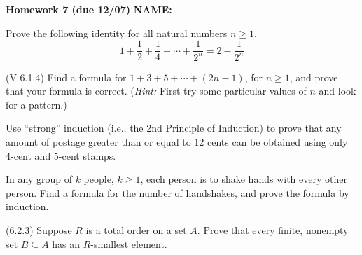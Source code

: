 \documentclass[addpoints,12pt]{exam}
\newif\ifanswers
\theoremstyle{remark}
\begin{document}
\hfill {\bf Homework 7 (due 12/07)} 
\hfill  \ifanswers {\bf ANSWERS} \else {\bf NAME:}\phantom{XXXXXXXXXXXXX} \fi 

  \renewcommand{\bigskip}{\vskip1cm}



\begin{questions} %

\pagestyle{foot}
  
\question[3] %
Prove the following identity for all natural numbers $n \geq 1$.
\begin{equation}
  \label{eq:3}
1 + \frac{1}{2} + \frac{1}{4} +\cdots + \frac{1}{2^n} = 2 - \frac{1}{2^n} %
\end{equation}


\newpage


\question[3] (V 6.1.4) Find a formula for $1+3+5 + \cdots + (2n - 1)$, for
$n \geq 1$, and prove that your formula is correct. ({\it Hint:} First try some particular values of $n$ and
look for a pattern.)

\newpage


\question[3] Use ``strong'' induction (i.e., the 2nd Principle of Induction)
to prove that any amount of postage greater than or equal to 12 cents can be
obtained using only 4-cent and 5-cent stamps.


\newpage
\question[3] In any group of $k$ people, $k\geq 1$, each person is to shake
hands with every other person.  Find a formula for the number of handshakes, and
prove the formula by induction. 
\medskip


\newpage

\question[3] (6.2.3) Suppose $R$ is a total order on a set $A$. Prove that every finite, nonempty
set $B \subseteq A$ has an $R$-smallest element.



\end{questions}
\end{document}
